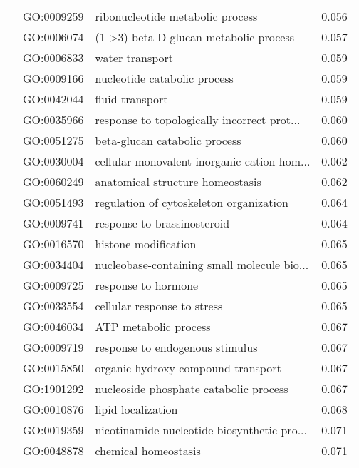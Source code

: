 \begin{longtable}{lllr}
   & GO:0009259 &             ribonucleotide metabolic process &         0.056 \\
   & GO:0006074 &       (1->3)-beta-D-glucan metabolic process &         0.057 \\
   & GO:0006833 &                              water transport &         0.059 \\
   & GO:0009166 &                 nucleotide catabolic process &         0.059 \\
   & GO:0042044 &                              fluid transport &         0.059 \\
   & GO:0035966 &  response to topologically incorrect prot... &         0.060 \\
   & GO:0051275 &                beta-glucan catabolic process &         0.060 \\
   & GO:0030004 &  cellular monovalent inorganic cation hom... &         0.062 \\
   & GO:0060249 &             anatomical structure homeostasis &         0.062 \\
   & GO:0051493 &      regulation of cytoskeleton organization &         0.064 \\
   & GO:0009741 &                  response to brassinosteroid &         0.064 \\
   & GO:0016570 &                         histone modification &         0.065 \\
   & GO:0034404 &  nucleobase-containing small molecule bio... &         0.065 \\
   & GO:0009725 &                          response to hormone &         0.065 \\
   & GO:0033554 &                  cellular response to stress &         0.065 \\
   & GO:0046034 &                        ATP metabolic process &         0.067 \\
   & GO:0009719 &              response to endogenous stimulus &         0.067 \\
   & GO:0015850 &           organic hydroxy compound transport &         0.067 \\
   & GO:1901292 &       nucleoside phosphate catabolic process &         0.067 \\
   & GO:0010876 &                           lipid localization &         0.068 \\
   & GO:0019359 &  nicotinamide nucleotide biosynthetic pro... &         0.071 \\
   & GO:0048878 &                         chemical homeostasis &         0.071 \\

\end{longtable}
